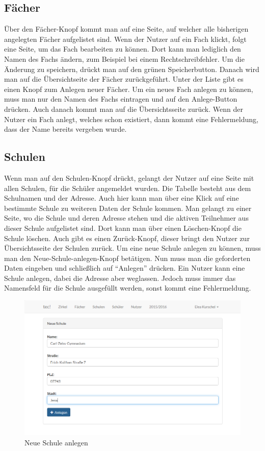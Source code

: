 \subsection{Fächer}
Über den Fächer-Knopf kommt man auf eine Seite, auf welcher alle bisherigen angelegten Fächer aufgelistet sind. Wenn der Nutzer auf ein Fach klickt, folgt eine Seite, um das Fach bearbeiten zu können. Dort kann man lediglich den Namen des Fachs ändern, zum Beispiel bei einem Rechtschreibfehler. Um die Änderung zu speichern, drückt man auf den grünen Speicherbutton. Danach wird man auf die Übersichtseite der Fächer zurückgeführt. Unter der Liste gibt es einen Knopf zum Anlegen neuer Fächer. Um ein neues Fach anlegen zu können, muss man nur den Namen des Fachs eintragen und auf den Anlege-Button drücken. Auch danach kommt man auf die Übersichtsseite zurück. Wenn der Nutzer ein Fach anlegt, welches schon existiert, dann kommt eine Fehlermeldung, dass der Name bereits vergeben wurde.

\subsection{Schulen}
Wenn man auf den Schulen-Knopf drückt, gelangt der Nutzer auf eine Seite mit allen Schulen, für die Schüler angemeldet wurden. Die Tabelle besteht aus dem Schulnamen und der Adresse. Auch hier kann man über eine Klick auf eine bestimmte Schule zu weiteren Daten der Schule kommen. Man gelangt zu einer Seite, wo die Schule und deren Adresse stehen und die aktiven Teilnehmer aus dieser Schule aufgelistet sind. Dort kann man über einen Löschen-Knopf die Schule löschen. Auch gibt es einen Zurück-Knopf, dieser bringt den Nutzer zur Übersichtsseite der Schulen zurück. Um eine neue Schule anlegen zu können, muss man den Neue-Schule-anlegen-Knopf betätigen. Nun muss man die geforderten Daten eingeben und schließlich auf "`Anlegen"' drücken. Ein Nutzer kann eine Schule anlegen, dabei die Adresse aber weglassen. Jedoch muss immer das Namensfeld für die Schule ausgefüllt werden, sonst kommt eine Fehlermeldung.

\begin{figure}[h]
	\centering
	\includegraphics[scale=.45]{bilder/Neue_Schule_anlegen.png}
	\caption{Neue Schule anlegen}
\end{figure}

